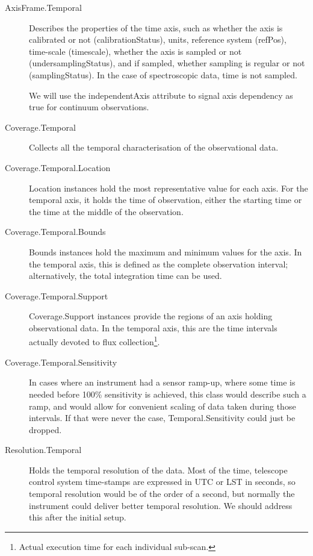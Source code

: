 			\begin{description}
				\item[AxisFrame.Temporal] Describes the 
				properties of the time axis, such as whether the
				axis is calibrated or not ({calibrationStatus}),
				units, reference system ({refPos}), time-scale
				({timescale}), whether the axis is sampled or not
				({undersamplingStatus}), and if sampled, whether
				sampling is regular or not ({samplingStatus}). In
				the case of spectroscopic data, time is not
				sampled.
				
				 We will use the {independentAxis} attribute to
				signal axis dependency as true for continuum
				observations.
				
				 \item[Coverage.Temporal] Collects all the temporal
				characterisation of the observational data.
				
				 \item[Coverage.Temporal.Location]
				Location instances hold the most representative
				value for each axis. For the temporal axis, it holds
				the time of observation, either the starting time
				or the time at the middle of the observation.
				
				 \item[Coverage.Temporal.Bounds] Bounds instances
				hold the maximum and minimum values for the axis.
				In the temporal axis, this is defined as the
				complete observation interval; alternatively, the
				total integration time can be used.
				
				 \item[Coverage.Temporal.Support] Coverage.Support
				instances provide the regions of an axis holding
				observational data. In the temporal axis, this are
				the time intervals actually devoted to flux
				collection\footnote{Actual execution time for each
				individual sub-scan.}.
				
				 \item[Coverage.Temporal.Sensitivity] In cases
				where an instrument had a sensor ramp-up, where
				some time is needed before 100\% sensitivity is
				achieved, this class would describe such a ramp,
				and would allow for convenient scaling of data
				taken during those intervals. If that were never
				the case, Temporal.Sensitivity could just be
				dropped.
				
				 \item[Resolution.Temporal] Holds the temporal
				resolution of the data. Most of the time, telescope
				control system time-stamps are expressed in UTC or
				LST in seconds, so temporal resolution would be of
				the order of a second, but normally the instrument
				could deliver better temporal resolution. We should
				address this after the initial setup.
				

\end{description}
